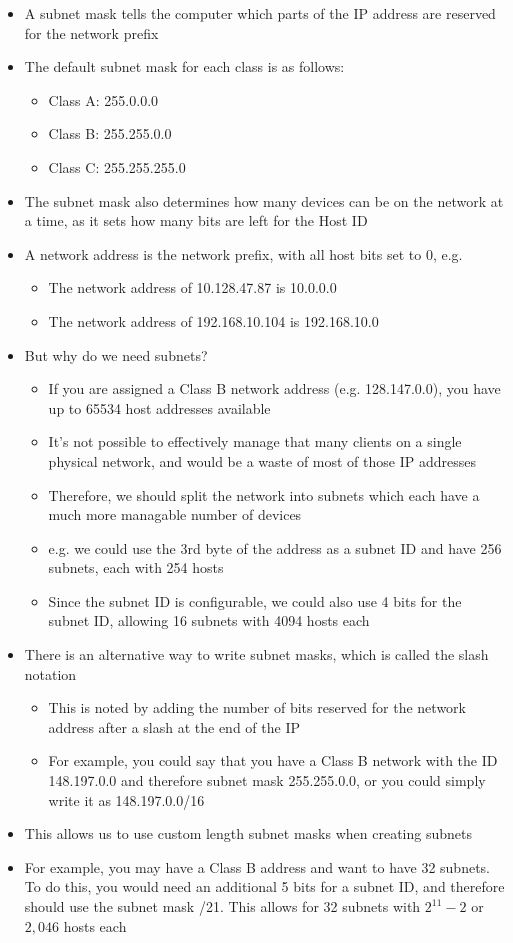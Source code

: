 \begin{itemize}
  \item A subnet mask tells the computer which parts of the IP address are reserved for the network prefix
  \item The default subnet mask for each class is as follows:
  \begin{itemize}
    \item Class A: 255.0.0.0
    \item Class B: 255.255.0.0
    \item Class C: 255.255.255.0
  \end{itemize}
  \item The subnet mask also determines how many devices can be on the network at a time, as it sets how many bits are left for the Host ID
  \item A network address is the network prefix, with all host bits set to 0, e.g.
  \begin{itemize}
    \item The network address of 10.128.47.87 is 10.0.0.0
    \item The network address of 192.168.10.104 is 192.168.10.0
  \end{itemize}
  \item But why do we need subnets?
  \begin{itemize}
    \item If you are assigned a Class B network address (e.g. 128.147.0.0), you have up to 65534 host addresses available
    \item It's not possible to effectively manage that many clients on a single physical network, and would be a waste of most of those IP addresses
    \item Therefore, we should split the network into subnets which each have a much more managable number of devices
    \item e.g. we could use the 3rd byte of the address as a subnet ID and have 256 subnets, each with 254 hosts
    \item Since the subnet ID is configurable, we could also use 4 bits for the subnet ID, allowing 16 subnets with 4094 hosts each
  \end{itemize}
  \item There is an alternative way to write subnet masks, which is called the slash notation
  \begin{itemize}
    \item This is noted by adding the number of bits reserved for the network address after a slash at the end of the IP
    \item For example, you could say that you have a Class B network with the ID 148.197.0.0 and therefore subnet mask 255.255.0.0, or you could simply write it as 148.197.0.0/16
  \end{itemize}
  \item This allows us to use custom length subnet masks when creating subnets
  \item For example, you may have a Class B address and want to have 32 subnets. To do this, you would need an additional 5 bits for a subnet ID, and therefore should use the subnet mask /21. This allows for 32 subnets with $2^{11}-2$ or $2,046$ hosts each
\end{itemize}